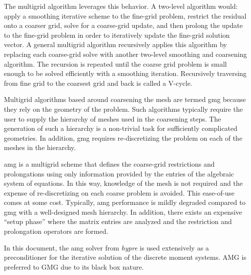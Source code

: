\documentclass[../doc.tex]{subfiles}
\begin{document}
The multigrid algorithm leverages this behavior. A two-level algorithm would: apply a smoothing iterative scheme to the fine-grid problem, restrict the residual onto a coarser grid, solve for a coarse-grid update, and then prolong the update to the fine-grid problem in order to iteratively update the fine-grid solution vector. 
A general multigrid algorithm recursively applies this algorithm by replacing each coarse-grid solve with another two-level smoothing and coarsening algorithm. The recursion is repeated until the coarse grid problem is small enough to be solved efficiently with a smoothing iteration. Recursively traversing from fine grid to the coarsest grid and back is called a V-cycle. 

Multigrid algorithms based around coarsening the mesh are termed \gls{gmg} because they rely on the geometry of the problem. Such algorithms typically require the user to supply the hierarchy of meshes used in the coarsening steps. The generation of such a hierarchy is a non-trivial task for sufficiently complicated geometries. In addition, \gls{gmg} requires re-discretizing the problem on each of the meshes in the hierarchy. 

\gls{amg} \cite{amg} is a multigrid scheme that defines the coarse-grid restrictions and prolongations using only information provided by the entries of the algebraic system of equations. In this way, knowledge of the mesh is not required and the expense of re-discretizing on each coarse problem is avoided. This ease-of-use comes at some cost. Typically, \gls{amg} performance is mildly degraded compared to \gls{gmg} with a well-designed mesh hierarchy. In addition, there exists an expensive ``setup phase'' where the matrix entries are analyzed and the restriction and prolongation operators are formed. 

In this document, the \gls{amg} solver from \emph{hypre} \cite{hypre} is used extensively as a preconditioner for the iterative solution of the discrete moment systems. AMG is preferred to GMG due to its black box nature. 
\end{document}
